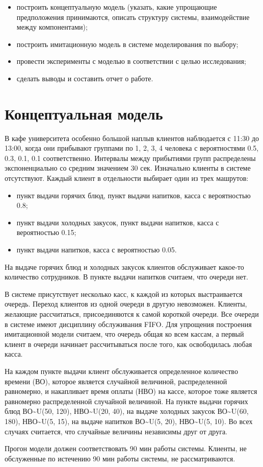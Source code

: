\documentclass[12pt, a4paper, fleqn]{article}
\begin{document}
\begin{itemize}[leftmargin=0.5cm]
	\item построить концептуальную модель (указать, какие упрощающие предположения принимаются, описать структуру системы, взаимодействие между компонентами);
	\item построить имитационную модель в системе моделирования по выбору; 
	\item провести эксперименты с моделью в соответствии с целью исследования;
	\item сделать выводы и составить отчет о работе.
\end{itemize}

\section{Концептуальная модель}

В кафе университета особенно большой наплыв клиентов наблюдается с 11:30 до 13:00, когда они прибывают группами по 1, 2, 3, 4 человека с вероятностями 0.5, 0.3, 0.1, 0.1 соответственно. Интервалы между прибытиями групп распределены экспоненциально со средним значением 30 сек. Изначально клиенты в системе отсутствуют. Каждый клиент в отдельности выбирает один из трех машрутов:

\begin{itemize}
	\item пункт выдачи горячих блюд, пункт выдачи напитков, касса с вероятностью 0.8;
	\item пункт выдачи холодных закусок, пункт выдачи напитков, касса с вероятностью 0.15;
	\item пункт выдачи напитков, касса с вероятностью 0.05.
\end{itemize}

На выдаче горячих блюд и холодных закусок клиентов обслуживает какое-то количество сотрудников. В пункте выдачи напитков считаем, что очереди нет. \par
В системе присутствует несколько касс, к каждой из которых выстраивается очередь. Переход клиентов из одной очереди в другую невозможен. Клиенты, желающие рассчитаться, присоединяются к самой короткой очереди. Все очереди в системе имеют дисциплину обслуживания FIFO. Для упрощения построения имитационной модели считаем, что очередь общая ко всем кассам, а первый клиент в очереди начинает рассчитываться после того, как освободилась любая касса. \par
На каждом пункте выдачи клиент обслуживается определенное количество времени (ВО), которое является случайной величиной, распределенной равномерно, и накапливает время оплаты (НВО) на кассе, которое тоже является равномерно распределенной случайной величиной. На пункте выдачи горячих блюд ВО\textasciitilde U(50, 120), НВО\textasciitilde U(20, 40), на выдаче холодных закусок ВО\textasciitilde U(60, 180), НВО\textasciitilde U(5, 15), на выдаче напитков ВО\textasciitilde U(5, 20), НВО\textasciitilde U(5, 10). Во всех случаях считается, что случайные величины независимы друг от друга. \par
Прогон модели должен соответствовать 90 мин работы системы. Клиенты, не обслуженные по истечению 90 мин работы системы, не рассматриваются.
\end{document}
